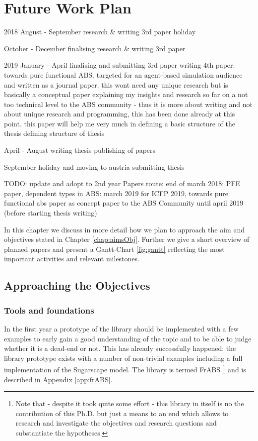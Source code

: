 \chapter{Future Work Plan}
\label{chap:future}

2018
August - September
	research \& writing 3rd paper
	holiday

October - December
	finalising research \& writing 3rd paper

2019
January - April
	finalising and submitting 3rd paper
	writing 4th paper: towards pure functional ABS. targeted for an agent-based simulation audience and written as a journal paper. this wont need any unique research but is basically a conceptual paper explaining my insights and research so far on a not too technical level to the ABS community - thus it is more about writing and not about unique research and programming, this has been done already at this point. this paper will help me very much in defining a basic structure of the thesis
	defining structure of thesis

April - August
	writing thesis
	publishing of papers

September
	holiday and moving to austria
	submitting thesis



TODO: update and adopt to 2nd year
Papers route: end of march 2018: PFE paper, dependent types in ABS: march 2019 for ICFP 2019, towards pure functional abs paper as concept paper to the ABS Community until april 2019 (before starting thesis writing) 

In this chapter we discuss in more detail how we plan to approach the aim and objectives stated in Chapter \ref{chap:aimsObj}. Further we give a short overview of planned papers and present a Gantt-Chart \ref{fig:gantt} reflecting the most important activities and relevant milestones.

\section{Approaching the Objectives}

\subsection{Tools and foundations}
In the first year a prototype of the library should be implemented with a few examples to early gain a good understanding of the topic and to be able to judge whether it is a dead-end or not. This has already successfully happened: the library prototype exists with a number of non-trivial examples including a full implementation of the Sugarscape model. The library is termed FrABS \footnote{Note that - despite it took quite some effort - this library in itself is no the contribution of this Ph.D. but just a means to an end which allows to research and investigate the objectives and research questions and substantiate the hypotheses.} and is described in Appendix \ref{app:frABS}.

